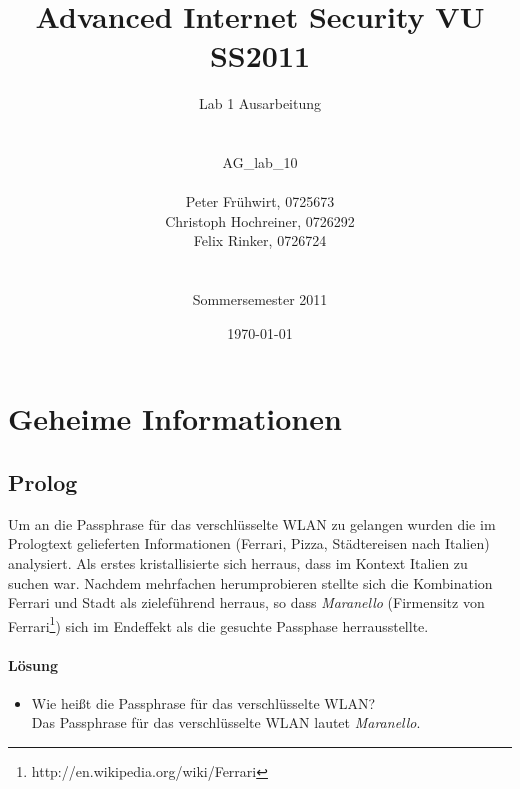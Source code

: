 \documentclass[12pt]{article}
\title{Advanced Internet Security VU SS2011}
\author{
	Lab 1 Ausarbeitung\\
	\\
	\\
	AG\_lab\_10\\
	\\
	Peter Fr\"uhwirt, 0725673  \\
	Christoph Hochreiner, 0726292 \\
	Felix Rinker, 0726724 \\
	\\
	\\
	Sommersemester 2011
}
\date{\today}
\begin{document}
\maketitle

\newpage
\tableofcontents
\newpage
\listoffigures

\lstlistoflistings
\newpage

\section{Geheime Informationen}

\subsection{Prolog}

Um an die Passphrase für das verschlüsselte WLAN zu gelangen wurden die im Prologtext gelieferten Informationen (Ferrari, Pizza, Städtereisen nach Italien) analysiert. Als erstes kristallisierte sich herraus, dass im Kontext Italien zu suchen war. Nachdem mehrfachen herumprobieren stellte sich die Kombination Ferrari und Stadt als zieleführend herraus, so dass \textit{Maranello} (Firmensitz von Ferrari\footnote{http://en.wikipedia.org/wiki/Ferrari}) sich im Endeffekt als die gesuchte Passphase herrausstellte.

\paragraph{Lösung}
\begin{itemize}
	\item Wie heißt die Passphrase für das verschlüsselte WLAN? \\
		Das  Passphrase für das verschlüsselte WLAN lautet \textit{Maranello}.
\end{itemize}
\end{document}
